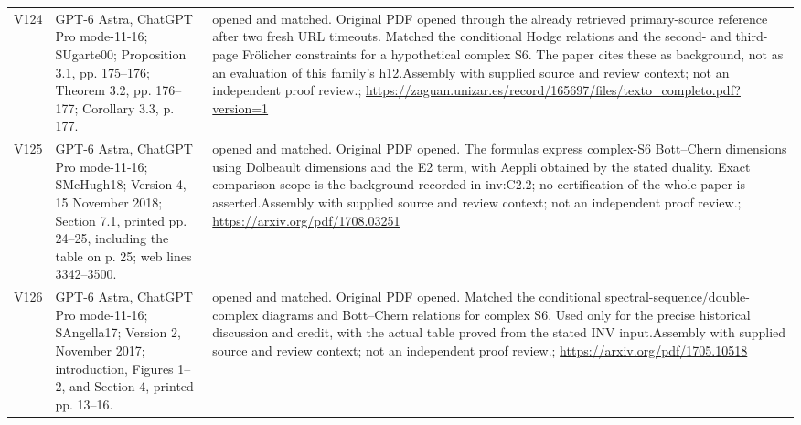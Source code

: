 \documentclass[11pt,a4paper]{article}
\theoremstyle{plain}
\theoremstyle{definition}
\begin{document}
\begin{longtable}{@{}L{.08\linewidth}L{.31\linewidth}L{.56\linewidth}@{}}
V124 & GPT-6 Astra, ChatGPT Pro mode-11-16; S\newline Ugarte00; Proposition 3.1, pp. 175--176; Theorem 3.2, pp. 176--177; Corollary 3.3, p. 177. & opened and matched. Original PDF opened through the already retrieved primary-source reference after two fresh URL timeouts. Matched the conditional Hodge relations and the second- and third-page Frölicher constraints for a hypothetical complex S6. The paper cites these as background, not as an evaluation of this family's h12.\newline Assembly with supplied source and review context; not an independent proof review.\newline {}; \url{https://zaguan.unizar.es/record/165697/files/texto_completo.pdf?version=1}\\
V125 & GPT-6 Astra, ChatGPT Pro mode-11-16; S\newline McHugh18; Version 4, 15 November 2018; Section 7.1, printed pp. 24--25, including the table on p. 25; web lines 3342--3500. & opened and matched. Original PDF opened. The formulas express complex-S6 Bott--Chern dimensions using Dolbeault dimensions and the E2 term, with Aeppli obtained by the stated duality. Exact comparison scope is the background recorded in inv:\allowbreak{}C2.2; no certification of the whole paper is asserted.\newline Assembly with supplied source and review context; not an independent proof review.\newline {}; \url{https://arxiv.org/pdf/1708.03251}\\
V126 & GPT-6 Astra, ChatGPT Pro mode-11-16; S\newline Angella17; Version 2, November 2017; introduction, Figures 1--2, and Section 4, printed pp. 13--16. & opened and matched. Original PDF opened. Matched the conditional spectral-sequence/\allowbreak{}double-complex diagrams and Bott--Chern relations for complex S6. Used only for the precise historical discussion and credit, with the actual table proved from the stated INV input.\newline Assembly with supplied source and review context; not an independent proof review.\newline {}; \url{https://arxiv.org/pdf/1705.10518}\\

\end{longtable}
\end{document}
